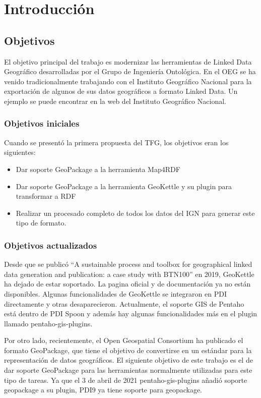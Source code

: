 \chapter{Introducción}

\section{Objetivos} El objetivo principal del trabajo es modernizar las herramientas
de Linked Data Geográfico desarrolladas por el Grupo de Ingeniería Ontológica. En el OEG se ha venido
tradicionalmente trabajando con el Instituto Geográfico Nacional para la exportación de algunos de sus datos
geográficos a formato Linked Data. Un ejemplo se puede encontrar en la web del Instituto Geográfico Nacional.
\cite{ign}

\subsection{Objetivos iniciales}
Cuando se presentó la primera propuesta del TFG, los objetivos eran los siguientes:
\begin{itemize}
    \item Dar soporte GeoPackage a la herramienta Map4RDF
    \item Dar soporte GeoPackage a la herramienta GeoKettle y su plugin para transformar a RDF
    \item Realizar un procesado completo de todos los datos del IGN para generar este tipo de formato.
\end{itemize}

\subsection{Objetivos actualizados}
Desde que se publicó ``A sustainable process and toolbox for geographical linked data generation and publication:
a case study with BTN100'' en 2019\cite{toolbox}, GeoKettle ha dejado de estar soportado. La pagina oficial y de documentación
ya no están disponibles. Algunas funcionalidades de GeoKettle se integraron en PDI directamente y otras
desaparecieron. Actualmente, el soporte GIS de Pentaho está dentro de PDI Spoon y además hay algunas
funcionalidades más en el plugin llamado pentaho-gis-plugins\cite{gis-plugins}. 

Por otro lado, recientemente, el Open Geospatial Consortium ha publicado el formato GeoPackage, que tiene el
objetivo de convertirse en un estándar para la representación de datos geográficos. El siguiente objetivo de este
trabajo es el de dar soporte GeoPackage para las herramientas normalmente utilizadas para este tipo de tareas.
Ya que el 3 de abril de 2021 pentaho-gis-plugins añadió soporte geopackage a su plugin, PDI9 ya tiene soporte
para geopackage.

